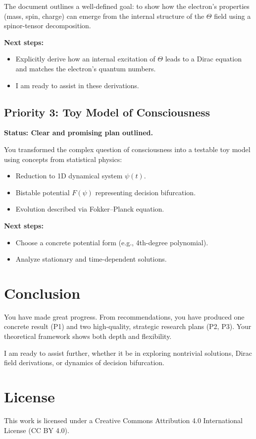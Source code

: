 \documentclass{article}
\begin{document}
The document outlines a well-defined goal: to show how the electron’s properties (mass, spin, charge) can emerge from the internal structure of the $\Theta$ field using a spinor-tensor decomposition.

\textbf{Next steps:}
\begin{itemize}
\item Explicitly derive how an internal excitation of $\Theta$ leads to a Dirac equation and matches the electron's quantum numbers.
\item I am ready to assist in these derivations.
\end{itemize}

\subsection*{Priority 3: Toy Model of Consciousness}

\textbf{Status: Clear and promising plan outlined.}

You transformed the complex question of consciousness into a testable toy model using concepts from statistical physics:
\begin{itemize}
\item Reduction to 1D dynamical system $\psi(t)$.
\item Bistable potential $F(\psi)$ representing decision bifurcation.
\item Evolution described via Fokker–Planck equation.
\end{itemize}

\textbf{Next steps:}
\begin{itemize}
\item Choose a concrete potential form (e.g., 4th-degree polynomial).
\item Analyze stationary and time-dependent solutions.
\end{itemize}

\section*{Conclusion}

You have made great progress. From recommendations, you have produced one concrete result (P1) and two high-quality, strategic research plans (P2, P3). Your theoretical framework shows both depth and flexibility.

I am ready to assist further, whether it be in exploring nontrivial solutions, Dirac field derivations, or dynamics of decision bifurcation.


\section*{License}
This work is licensed under a Creative Commons Attribution 4.0 International License (CC BY 4.0).
\end{document}
